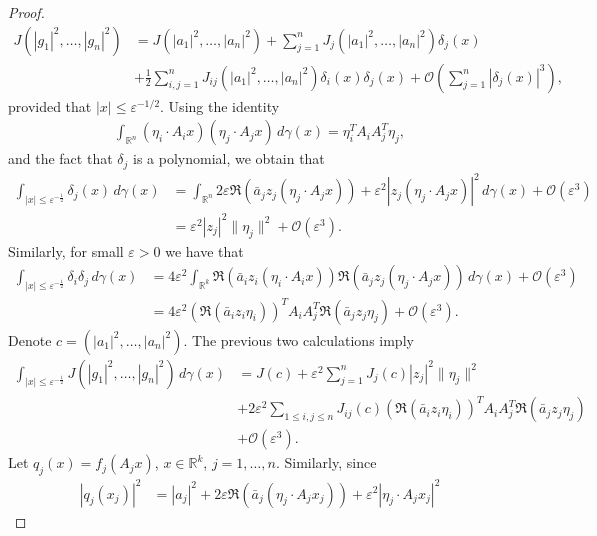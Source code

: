 \documentclass[9pt, a4paper]{amsart}
\newcommand{\R}{\mathbb{R}}
\newcommand{\1}{{\chi_{}}}%
\numberwithin{equation}{section}
\begin{document}
\begin{proof}
		\begin{align*}
			J(|g_1|^2,\ldots,|g_n|^2)&= J(|a_1|^2,\ldots,|a_n|^2)  +\sum_{j=1}^n J_j(|a_1|^2,\ldots,|a_n|^2) \delta_j(x) \\
			&+ \frac{1}{2} \sum_{ i,j=1}^{n} J_{ij}(|a_1|^2,\ldots,|a_n|^2) \delta_i(x)\delta_j(x) + \mathcal{O}(\sum_{j=1}^n|\delta_j(x)|^3),   
		\end{align*}
		provided that $|x|\leq \varepsilon^{-1/2}$. Using the identity 
		\begin{align*}
			\int_{\R^n}(\eta_i\cdot A_ix)( \eta_j\cdot A_jx)\,d\gamma(x)=\eta_i^TA_iA_j^T \eta_j,
		\end{align*}
		and the fact that $\delta_j$ is a polynomial, we obtain that
		\begin{align*}
			\int_{| x|\leq \varepsilon^{-\frac{1}{2}}}\delta_j(x)\,d\gamma(x)&=\int_{\R^n}2\varepsilon \Re(\bar{a}_jz_j(\eta_j\cdot A_jx))+\varepsilon^2|z_j(\eta_j\cdot A_j x)|^2\,d\gamma(x)+ \mathcal{O}(\varepsilon^3)\\
			&=\varepsilon^2 |z_j|^2\|\eta_j\|^2 + \mathcal{O}(\varepsilon^3).
		\end{align*}
		Similarly, for small $\varepsilon>0$ we have that
		\begin{align*}
			\int_{| x|\leq \varepsilon^{-\frac{1}{2}}}\delta_i\delta_j\,d\gamma(x)
			&=  4\varepsilon^2\int_{\R^k}\Re(\bar{a}_iz_i(\eta_i\cdot A_ix)) \Re(\bar{a}_jz_j(\eta_j\cdot A_jx))\,d\gamma(x)+\mathcal{O}(\varepsilon^3)\\
			&= 4\varepsilon^{2} (\Re(\bar{a}_{i}z_{i}\eta_{i}))^{T} A_{i}A_{j}^{T} \Re(\bar{a}_{j}z_{j}\eta_{j}) + \mathcal{O}(\varepsilon^3).
		\end{align*} 
		Denote $c=(|a_1|^2,\ldots,|a_n|^2)$. The previous two calculations imply
		\begin{align*}
			\int_{| x|\leq \varepsilon^{-\frac{1}{2}}}J(|g_1|^2,\ldots,|g_n|^2)\,d\gamma(x)&= J(c)  +\varepsilon^2\sum_{j=1}^n J_j(c) |z_j|^2\|\eta_j\|^2\\
			&+ 2\varepsilon^2\sum_{1\leq i,j\leq n} J_{ij}(c)(\Re(\bar{a}_{i}z_{i}\eta_{i}))^{T} A_{i}A_{j}^{T} \Re(\bar{a}_{j}z_{j}\eta_{j})\\
   &+ \mathcal{O}(\varepsilon^3).
		\end{align*}
		Let $q_j(x)=f_j(A_jx)$, $x\in\R^k$, $j=1,\ldots,n$. Similarly,	since
		\begin{align*}
			|q_j(x_j)|^2&=|a_j|^2+2\varepsilon \Re(\bar{a}_j(\eta_j\cdot A_jx_j))+\varepsilon^2|\eta_j\cdot A_jx_j|^2
		\end{align*}

\end{proof}
\end{document}
